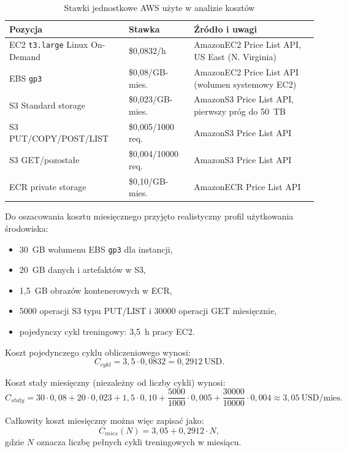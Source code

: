 \begin{table}[H]
\centering
\caption{Stawki jednostkowe AWS użyte w analizie kosztów}
\label{tab:koszty-cennik}
\begin{tabular}{|p{5.2cm}|p{2.1cm}|p{6.7cm}|}
\hline
\textbf{Pozycja} & \textbf{Stawka} & \textbf{Źródło i uwagi} \\
\hline
EC2 \texttt{t3.large} Linux On-Demand & \$0{,}0832/h & AmazonEC2 Price List API, US East (N. Virginia) \\
\hline
EBS \texttt{gp3} & \$0{,}08/GB-mies. & AmazonEC2 Price List API (wolumen systemowy EC2) \\
\hline
S3 Standard storage & \$0{,}023/GB-mies. & AmazonS3 Price List API, pierwszy próg do 50~TB \\
\hline
S3 PUT/COPY/POST/LIST & \$0{,}005/1000 req. & AmazonS3 Price List API \\
\hline
S3 GET/pozostałe & \$0{,}004/10000 req. & AmazonS3 Price List API \\
\hline
ECR private storage & \$0{,}10/GB-mies. & AmazonECR Price List API \\
\hline
\end{tabular}
\end{table}

Do oszacowania kosztu miesięcznego przyjęto realistyczny profil użytkowania środowiska:
\begin{itemize}
  \item 30~GB wolumenu EBS \texttt{gp3} dla instancji,
  \item 20~GB danych i artefaktów w S3,
  \item 1{,}5~GB obrazów kontenerowych w ECR,
  \item 5000 operacji S3 typu PUT/LIST i 30000 operacji GET miesięcznie,
  \item pojedynczy cykl treningowy: 3{,}5~h pracy EC2.
\end{itemize}

Koszt pojedynczego cyklu obliczeniowego wynosi:
\[
C_{cykl} = 3{,}5 \cdot 0{,}0832 = 0{,}2912\ \text{USD}.
\]

Koszt stały miesięczny (niezależny od liczby cykli) wynosi:
\[
C_{stały} = 30\cdot0{,}08 + 20\cdot0{,}023 + 1{,}5\cdot0{,}10 + \frac{5000}{1000}\cdot0{,}005 + \frac{30000}{10000}\cdot0{,}004 \approx 3{,}05\ \text{USD/mies.}
\]

Całkowity koszt miesięczny można więc zapisać jako:
\[
C_{mies}(N)=3{,}05 + 0{,}2912\cdot N,
\]
gdzie \(N\) oznacza liczbę pełnych cykli treningowych w miesiącu.

